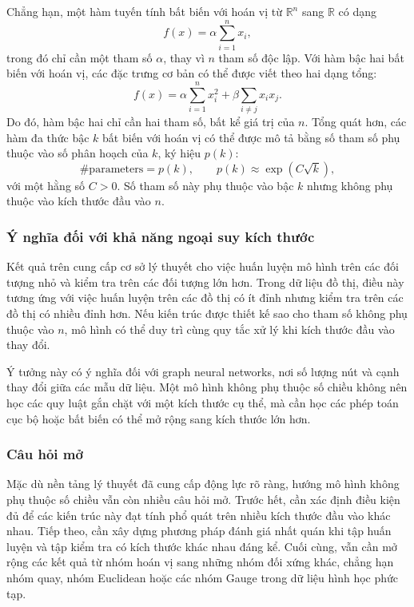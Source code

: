Chẳng hạn, một hàm tuyến tính bất biến với hoán vị từ $\mathbb{R}^n$ sang $\mathbb{R}$ có dạng
\begin{equation}
    f(x)
    =
    \alpha \sum_{i=1}^{n} x_i,
    \label{eq:dimension-free-linear}
\end{equation}
trong đó chỉ cần một tham số $\alpha$, thay vì $n$ tham số độc lập. Với hàm bậc hai bất biến với hoán vị, các đặc trưng cơ bản có thể được viết theo hai dạng tổng:
\begin{equation}
    f(x)
    =
    \alpha \sum_{i=1}^{n} x_i^2
    +
    \beta \sum_{i \neq j} x_i x_j.
    \label{eq:dimension-free-quadratic}
\end{equation}
Do đó, hàm bậc hai chỉ cần hai tham số, bất kể giá trị của $n$. Tổng quát hơn, các hàm đa thức bậc $k$ bất biến với hoán vị có thể được mô tả bằng số tham số phụ thuộc vào số phân hoạch của $k$, ký hiệu $p(k)$:
\begin{equation}
    \#\mathrm{parameters}
    =
    p(k),
    \qquad
    p(k) \approx \exp(C\sqrt{k}),
    \label{eq:partition-parameter-count}
\end{equation}
với một hằng số $C > 0$. Số tham số này phụ thuộc vào bậc $k$ nhưng không phụ thuộc vào kích thước đầu vào $n$.

\subsubsection{Ý nghĩa đối với khả năng ngoại suy kích thước}

Kết quả trên cung cấp cơ sở lý thuyết cho việc huấn luyện mô hình trên các đối tượng nhỏ và kiểm tra trên các đối tượng lớn hơn. Trong dữ liệu đồ thị, điều này tương ứng với việc huấn luyện trên các đồ thị có ít đỉnh nhưng kiểm tra trên các đồ thị có nhiều đỉnh hơn. Nếu kiến trúc được thiết kế sao cho tham số không phụ thuộc vào $n$, mô hình có thể duy trì cùng quy tắc xử lý khi kích thước đầu vào thay đổi.

Ý tưởng này có ý nghĩa đối với graph neural networks, nơi số lượng nút và cạnh thay đổi giữa các mẫu dữ liệu. Một mô hình không phụ thuộc số chiều không nên học các quy luật gắn chặt với một kích thước cụ thể, mà cần học các phép toán cục bộ hoặc bất biến có thể mở rộng sang kích thước lớn hơn.

\subsubsection{Câu hỏi mở}

Mặc dù nền tảng lý thuyết đã cung cấp động lực rõ ràng, hướng mô hình không phụ thuộc số chiều vẫn còn nhiều câu hỏi mở. Trước hết, cần xác định điều kiện đủ để các kiến trúc này đạt tính phổ quát trên nhiều kích thước đầu vào khác nhau. Tiếp theo, cần xây dựng phương pháp đánh giá nhất quán khi tập huấn luyện và tập kiểm tra có kích thước khác nhau đáng kể. Cuối cùng, vẫn cần mở rộng các kết quả từ nhóm hoán vị sang những nhóm đối xứng khác, chẳng hạn nhóm quay, nhóm Euclidean hoặc các nhóm Gauge trong dữ liệu hình học phức tạp.


